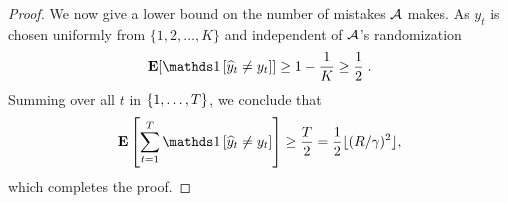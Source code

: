 \begin{proof}
We now give a lower bound on the number of mistakes $\mathcal{A}$ makes.
As $y_t$ is chosen uniformly from $\{1,2,\dots,K\}$ and independent of
$\mathcal{A}$'s randomization
$$
\Exp[ \indicator{\widehat y_t \neq y_t} ] \ge 1 - \frac{1}{K} \ge \frac{1}{2} \; .
$$
Summing over all $t$ in $\cbr{1,\ldots,T}$, we conclude that
$$
\Exp \sbr{ \sum_{t=1}^T \indicator{\widehat y_t \neq y_t} } \geq \frac T 2 = \frac 1 2 \lfloor (R/\gamma)^2 \rfloor,
$$
which completes the proof.
\end{proof}

